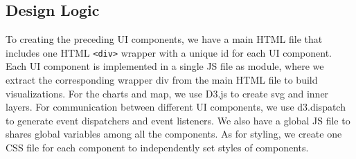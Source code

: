 \subsection{Design Logic}
To creating the preceding UI components, we have a main HTML file that includes one HTML \texttt{<div>} wrapper with a unique id for each UI component. Each UI component is implemented in a single JS file as module, where we extract the corresponding wrapper div from the main HTML file to build visualizations. For the charts and map, we use D3.js to create svg and inner layers. For communication between different UI components, we use d3.dispatch to generate event dispatchers and event listeners.  We also have a global JS file to shares global variables among all the components. As for styling, we create one CSS file for each component to independently set styles of components.
